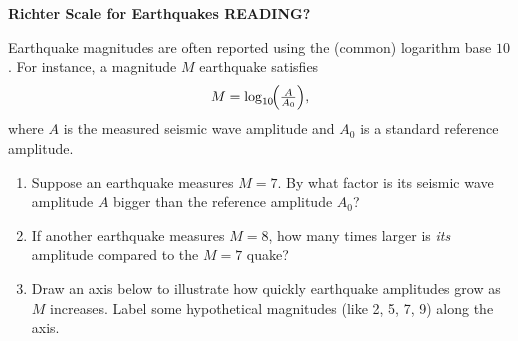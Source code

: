 \documentclass[noauthor,nooutcomes,handout,hints,12pt]{ximera}
\begin{document}
\begin{question}
    \textbf{Richter Scale for Earthquakes READING?}

    Earthquake magnitudes are often reported using the (common) logarithm
    base \(10\). For instance, a magnitude \(M\) earthquake satisfies
    \[
        M = \log_{10}\!\Bigl(\tfrac{A}{A_0}\Bigr),
    \]
    where \(A\) is the measured seismic wave amplitude and \(A_0\) is a
    standard reference amplitude.

    \begin{enumerate}
        \item Suppose an earthquake measures \(M=7\). By what factor is its
              seismic wave amplitude \(A\) bigger than the reference amplitude
              \(A_0\)?

        \item If another earthquake measures \(M=8\), how many times larger is
              \emph{its} amplitude compared to the \(M=7\) quake?

        \item Draw an axis below to illustrate how quickly earthquake
              amplitudes grow as \(M\) increases. Label some hypothetical
              magnitudes (like 2, 5, 7, 9) along the axis.

    \end{enumerate}

    \begin{center}
    \end{center}
\end{question}

\mynewpage
\end{document}
